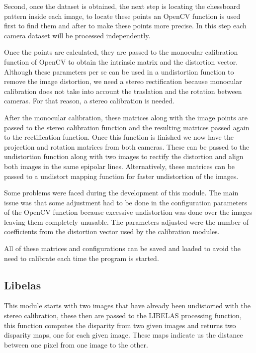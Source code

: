 \documentclass[10pt,a4paper,twocolumn,twoside]{article}
\begin{document}
	Second, once the dataset is obtained, the next step is locating the chessboard pattern inside each image, to locate these points an OpenCV function is used first to find them and after to make these points more precise. In this step each camera dataset will be processed independently. 
	
	Once the points are calculated, they are passed to the monocular calibration function of OpenCV to obtain the intrinsic matrix and the distortion vector.  Although these parameters per se can be used in a undistortion function to remove the image distortion, we need a stereo rectification because monocular calibration does not take into account the traslation and the rotation between cameras. For that reason, a stereo calibration is needed. 
	
	After the monocular calibration, these matrices along with the image points are passed to the stereo calibration function and the resulting matrices passed again to the rectification function. Once this function is finished we now have the projection and rotation matrices from both cameras. These can be passed to the undistortion function along with two images to rectify the distortion and align both images in the same epipolar lines. Alternatively, these matrices can be passed to a undistort mapping function for faster undistortion of the images.  
	
	Some problems were faced during the development of this module. The main issue was that some adjustment had to be done in the configuration parameters of the OpenCV function because excessive undistortion was done over the images leaving them completely unusable. The parameters adjusted were the number of coefficients from the distortion vector used by the calibration modules. 
	
	All of these matrices and configurations can be saved and loaded to avoid the need to calibrate each time the program is started.  
	
	\subsection{Libelas}
	\label{sec:libelas}
	 This module starts with two images that have already been undistorted with the stereo calibration, these then are passed to the LIBELAS processing function, this function computes the disparity from two given images and returns two disparity maps, one for each given image. These maps indicate us the distance between one pixel from one image to the other.  
	 
\end{document}

